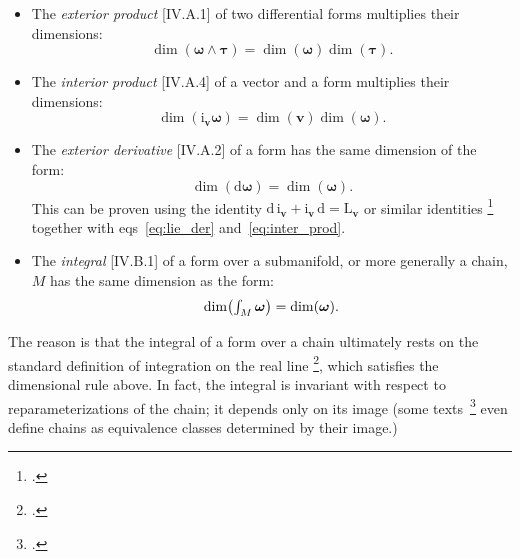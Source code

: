 \documentclass[\ifafour a4paper,12pt,\else a5paper,10pt,\fi%
onecolumn,oneside,article,%
british%
]{memoir}
\theoremstyle{remark}
\theoremstyle{innote}
\newcommand*{\citep}{\footcites}
\newcommand*{\di}{\mathrm{d}}%
\renewcommand*{\|}[1][]{\nonscript\,#1\vert\nonscript\;\mathopen{}}
\newcommand*{\sect}{\S}%
\newcommand*{\sects}{\S\S}%
\newcommand*{\chap}{ch.}%
\newcommand*{\eqns}{eqs}%
\newcommand*{\eg}{{e.g.}}
\newcommand*{\tint}{\begingroup\textstyle\int\endgroup\nolimits}
\newcommand*{\Li}{\mathrm{L}}
\newcommand*{\ii}{\mathrm{i}}
\newcommand*{\yom}{\bm{\omega}}
\newcommand*{\yta}{\bm{\tau}}
\newcommand*{\yv}{\bm{v}}
\begin{document}
\begin{itemize}[wide=0pt]
\item The \emph{exterior product} [IV.A.1] of two differential forms
  multiplies their dimensions:
  \begin{equation}
  \dim(\yom\land\yta) = \dim(\yom)\dim(\yta).\label{eq:ext_prod}
\end{equation}
  
\item The \emph{interior product} [IV.A.4] of a vector and a form
  multiplies their dimensions:
  \begin{equation}
    \dim(\ii_{\yv}\yom) =\dim(\yv)\dim(\yom).
    \label{eq:inter_prod}
\end{equation}

\item The \emph{exterior derivative} [IV.A.2] of a form has the same
  dimension of the form:
  \begin{equation}
    \dim(\di\yom) =\dim(\yom).
    \label{eq:ext_deriv}
  \end{equation}
  This can be proven using the identity
  $\di\,\ii_{\yv}+\ii_{\yv}\,\di = \Li_{\yv}$ or similar identities
  \citep[\chap~9 p.~180 Theorem~9.78]{curtisetal1985}[\sect~6.4
  Theorem~6.4.8]{abrahametal1983_r1988} together with
  \eqns~\eqref{eq:lie_der} and~\eqref{eq:inter_prod}.

\item The \emph{integral} [IV.B.1] of a form over a submanifold, or more
  generally a chain, $M$ has the same dimension as the form:
  \begin{equation}
    \dim\bigl(\tint_{M}\yom\bigr) =\dim(\yom).
    \label{eq:integration}
  \end{equation}
\end{itemize}
The reason is that the integral of a form over a chain ultimately rests on
the standard definition of integration on the real line
\citep[\eg][\sects~IV.B.1--2]{choquetbruhatetal1977_r1996}[\sect~5 p.~21,
\sect~6
p.~24]{derham1955_t1984}[\sect~7.1]{abrahametal1983_r1988}[\sect~VI.2]{boothby1975_r2003},
which satisfies the dimensional rule above. In fact, the integral is
invariant with respect to reparameterizations of the chain; it depends only
on its image (some texts~\citep[\eg][\sect~10.4
p.~297]{martin1991_r2004}[\sect~7.3]{fecko2006} even define chains as
equivalence classes determined by their image.)

\medskip

\end{document}
